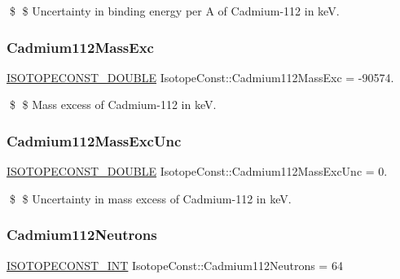\$ \$ Uncertainty in binding energy per A of Cadmium-\/112 in keV. \mbox{\label{group___isotope_const-_cadmium-_cd112_gaae8187c9298fa76b535fd5865805d73a}} 
\subsubsection{\texorpdfstring{Cadmium112\+Mass\+Exc}{Cadmium112MassExc}}
{\footnotesize\ttfamily \mbox{\hyperlink{group___isotope_const-_macros_ga8f45a7272ce02c0b4c65c44636ed719a}{I\+S\+O\+T\+O\+P\+E\+C\+O\+N\+S\+T\+\_\+\+D\+O\+U\+B\+LE}} Isotope\+Const\+::\+Cadmium112\+Mass\+Exc = -\/90574.}

\$ \$ Mass excess of Cadmium-\/112 in keV. \mbox{\label{group___isotope_const-_cadmium-_cd112_ga9707c659e584971be877f01a3810942b}} 
\subsubsection{\texorpdfstring{Cadmium112\+Mass\+Exc\+Unc}{Cadmium112MassExcUnc}}
{\footnotesize\ttfamily \mbox{\hyperlink{group___isotope_const-_macros_ga8f45a7272ce02c0b4c65c44636ed719a}{I\+S\+O\+T\+O\+P\+E\+C\+O\+N\+S\+T\+\_\+\+D\+O\+U\+B\+LE}} Isotope\+Const\+::\+Cadmium112\+Mass\+Exc\+Unc = 0.}

\$ \$ Uncertainty in mass excess of Cadmium-\/112 in keV. \mbox{\label{group___isotope_const-_cadmium-_cd112_ga5904b6e551bbe91e38012d3efa6eddb9}} 
\subsubsection{\texorpdfstring{Cadmium112\+Neutrons}{Cadmium112Neutrons}}
{\footnotesize\ttfamily \mbox{\hyperlink{group___isotope_const-_macros_ga5f18360b3e99483a35c32d789e62621c}{I\+S\+O\+T\+O\+P\+E\+C\+O\+N\+S\+T\+\_\+\+I\+NT}} Isotope\+Const\+::\+Cadmium112\+Neutrons = 64}

